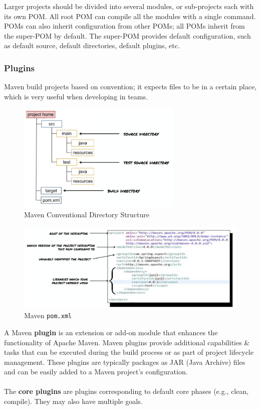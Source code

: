 \documentclass[a4paper,11pt]{article}
\begin{document}
Larger projects should be divided into several modules, or sub-projects each with its own POM.
All root POM can compile all the modules with a single command.
POMs can also inherit configuration from other POMs; all POMs inherit from the super-POM by default.
The super-POM provides default configuration, such as default source, default directories, default plugins,
etc.

\subsubsection{Plugins}
Maven build projects based on convention; it expects files to be in a certain place, which is very useful 
when developing in teams.

\begin{figure}[H]
    \centering
    \includegraphics[width=0.7\textwidth]{images/mvn_conv_dir_structure.png}
    \caption{Maven Conventional Directory Structure}
\end{figure}

\begin{figure}[H]
    \centering
    \includegraphics[width=\textwidth]{images/mvn_pom.png}
    \caption{Maven \texttt{pom.xml}}
\end{figure}

A Maven \textbf{plugin} is an extension or add-on module that enhances the functionality of Apache Maven.
Maven plugins provide additional capabilities \& tasks that can be executed during the build process or as part of 
project lifecycle management.
These plugins are typically packages as JAR (Java Archive) files and can be easily added to a Maven project's
configuration.
\\\\
The \textbf{core plugins} are plugins corresponding to default core phases (e.g., clean, compile).
They may also have multiple goals.
\end{document}
